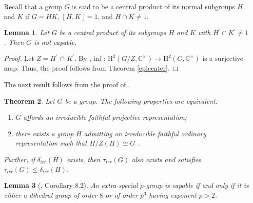 \documentclass[a4paper,11pt]{amsart}
\numberwithin{equation}{section}
\numberwithin{equation}{subsection}
\newtheorem{theorem}{Theorem}[section]
\newtheorem{lemma}[theorem]{Lemma}
\begin{document}
	Recall that a group $G$ is said to be a central product of its normal subgroups $H$ and $K$ if $G=HK$, $[H, K]= 1$, and $H \cap K \neq 1$.
	
	\begin{lemma} \label{central product}
		Let $G$ be a central product of its subgroups $H$ and $K$ with $H^{\prime} \cap K^{\prime} \neq 1$. Then $G$ is not capable.      
	\end{lemma}
	
	\begin{proof}
		Let $Z = H^{\prime}$ $\cap$ $K^{\prime}$. By \cite[Theorem 3.1]{central}, inf : $\mathrm{H}^2\left(G / Z, \mathbb{C}^{\times}\right) \rightarrow \mathrm{H}^2\left(G, \mathbb{C}^{\times}\right)$ is a surjective map. Thus, the proof follows from Theorem \ref{epicenter}. 
		
	\end{proof}
	The next result follows from the proof of \cite[Chapter 4, Theorem 3.1]{karpilovsky2}.%
	\begin{theorem} \label{capable groups}
		Let $G$ be a group. The following properties are equivalent:
		\begin{enumerate}
			\item[(i)] $G$ affords an irreducible faithful projective representation;
			\item[(ii)] there exists a group $H$ admitting an irreducible faithful ordinary representation such that $H/Z(H) \cong G$ .   
		\end{enumerate}
		Further, if $\delta_{irr}(H)$ exists, then $\tau_{irr}(G)$ also exists and satisfies $\tau_{irr}(G) \le \delta_{irr}(H)$. %
		
	\end{theorem}
	
	\begin{lemma}[\cite{Beyl}, Corollary 8.2] \label{capability of extra special $p$-group}
		An extra-special $p$-group is capable if and only if it is either a dihedral group of order $8$ or of order $p^3$ having exponent $p > 2$.    
	\end{lemma}   
	
	
	
\end{document}
